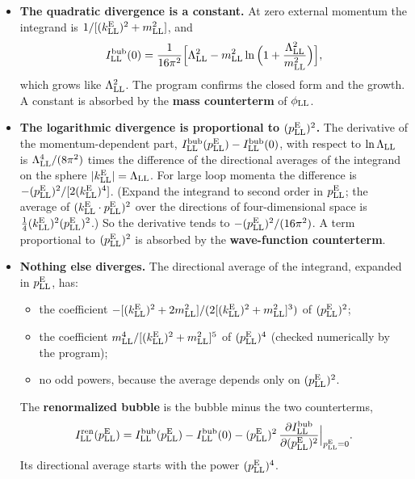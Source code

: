 \documentclass[
  10pt,
]{article}
\providecommand{\tightlist}{%
  \setlength{\itemsep}{0pt}\setlength{\parskip}{0pt}}
\begin{document}
\begin{itemize}
\tightlist
\item
  \textbf{The quadratic divergence is a constant.} At zero external
  momentum the integrand is \(1/[(k^{\rm E}_{\rm LL})^2+m_{\rm LL}^2]\),
  and
  \[I^{\rm bub}_{\rm LL}(0)=\frac1{16\pi^2}\Big[\Lambda_{\rm LL}^2-m_{\rm LL}^2\ln\Big(1+\frac{\Lambda_{\rm LL}^2}{m_{\rm LL}^2}\Big)\Big],\]
  which grows like \(\Lambda_{\rm LL}^2\). The program confirms the
  closed form and the growth. A constant is absorbed by the \textbf{mass
  counterterm} of \(\phi_{\rm LL}\).
\item
  \textbf{The logarithmic divergence is proportional to
  \((p^{\rm E}_{\rm LL})^2\).} The derivative of the momentum-dependent
  part,
  \(I^{\rm bub}_{\rm LL}(p^{\rm E}_{\rm LL})-I^{\rm bub}_{\rm LL}(0)\),
  with respect to \(\ln\Lambda_{\rm LL}\) is
  \(\Lambda_{\rm LL}^4/(8\pi^2)\) times the difference of the
  directional averages of the integrand on the sphere
  \(\lvert k^{\rm E}_{\rm LL}\rvert=\Lambda_{\rm LL}\). For large loop
  momenta the difference is
  \(-(p^{\rm E}_{\rm LL})^2/[2(k^{\rm E}_{\rm LL})^4]\). (Expand the
  integrand to second order in \(p^{\rm E}_{\rm LL}\); the average of
  \((k^{\rm E}_{\rm LL}\cdot p^{\rm E}_{\rm LL})^2\) over the directions
  of four-dimensional space is
  \(\tfrac14(k^{\rm E}_{\rm LL})^2(p^{\rm E}_{\rm LL})^2\).) So the
  derivative tends to \(-(p^{\rm E}_{\rm LL})^2/(16\pi^2)\). A term
  proportional to \((p^{\rm E}_{\rm LL})^2\) is absorbed by the
  \textbf{wave-function counterterm}.
\item
  \textbf{Nothing else diverges.} The directional average of the
  integrand, expanded in \(p^{\rm E}_{\rm LL}\), has:

  \begin{itemize}
  \tightlist
  \item
    the coefficient
    \(-[(k^{\rm E}_{\rm LL})^2+2m_{\rm LL}^2]/(2[(k^{\rm E}_{\rm LL})^2+m_{\rm LL}^2]^3)\)
    of \((p^{\rm E}_{\rm LL})^2\);
  \item
    the coefficient
    \(m_{\rm LL}^4/[(k^{\rm E}_{\rm LL})^2+m_{\rm LL}^2]^5\) of
    \((p^{\rm E}_{\rm LL})^4\) (checked numerically by the program);
  \item
    no odd powers, because the average depends only on
    \((p^{\rm E}_{\rm LL})^2\).
  \end{itemize}

  The \textbf{renormalized bubble} is the bubble minus the two
  counterterms,
  \[I^{\rm ren}_{\rm LL}(p^{\rm E}_{\rm LL})=I^{\rm bub}_{\rm LL}(p^{\rm E}_{\rm LL})-I^{\rm bub}_{\rm LL}(0)-(p^{\rm E}_{\rm LL})^2\,\frac{\partial I^{\rm bub}_{\rm LL}}{\partial(p^{\rm E}_{\rm LL})^2}\Big|_{p^{\rm E}_{\rm LL}=0}.\]
  Its directional average starts with the power
  \((p^{\rm E}_{\rm LL})^4\).


\end{itemize}
\end{document}
